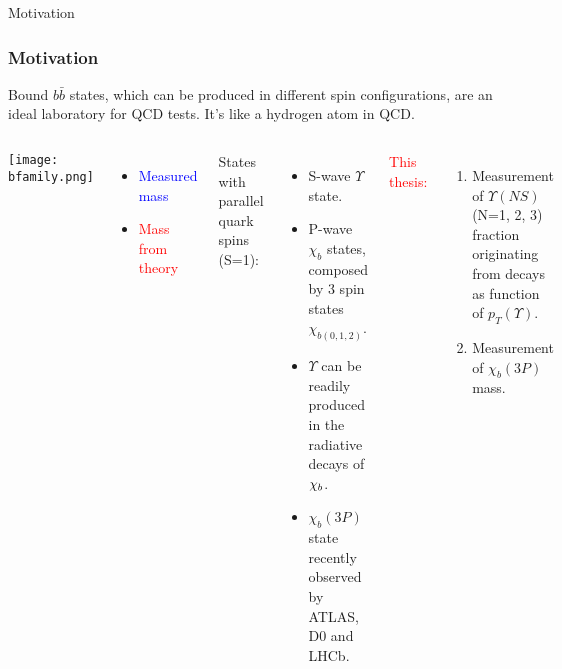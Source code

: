 \begin{frame}{Motivation}

\frametitle{Motivation}
Bound $b\bar{b}$ states, which can be produced in different spin
configurations, are an ideal laboratory for QCD tests. It's like a hydrogen
atom in QCD.
\begin{columns}[c]
\texttt{[image: bfamily.png]}
\begin{itemize}
  \item \textcolor{blue}{Measured mass}
  \item \textcolor{red}{Mass from theory}
\end{itemize}
\fontsize{9pt}{7.2}\selectfont
States with parallel quark spins (S=1):
\begin{itemize}
  \item S-wave $\Upsilon$ state.
  \item P-wave $\chi_{b}$ states, composed by 3 spin states $\chi_{b(0,1,2)}$. 
  \item $\Upsilon$ can be readily produced in the radiative decays of $\chi_{b}$.
  \item $\chi_{b}(3P)$ state recently observed by ATLAS, D0 and LHCb.
\end{itemize}
\textcolor{red}{This thesis:}
\begin{enumerate}
  \item Measurement of  $\Upsilon(NS)$ (N=1, 2, 3) fraction  originating from \chib decays as function of $p_T(\Upsilon)$.
  \item Measurement of $\chi_{b}(3P)$ mass.
\end{enumerate}
\end{columns}

\end{frame}